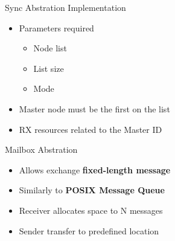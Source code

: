 		\begin{frame}[fragile]{Sync Abstration Implementation}
			\begin{itemize}
				\item Parameters required
				\begin{itemize}
					\item Node list
					\item List size
					\item Mode
				\end{itemize}
				\item Master node must be the first on the list
				\item RX resources related to the Master ID
			\end{itemize}


		\end{frame}

		\begin{frame}[fragile]{Mailbox Abstration}
			\begin{itemize}
				\item Allows exchange \textbf{fixed-length message}
				\item Similarly to \textbf{POSIX Message Queue}
				\item Receiver allocates space to N messages
				\item Sender transfer to predefined location
			\end{itemize}

	
		\end{frame}

